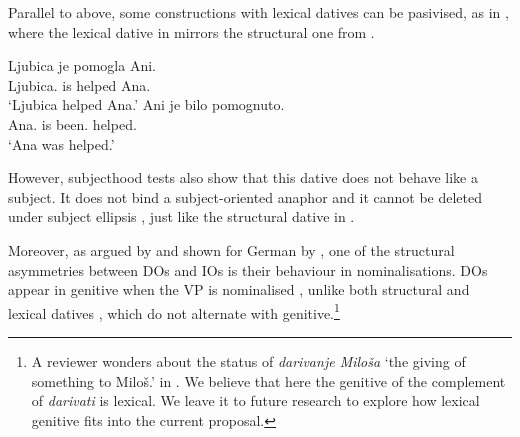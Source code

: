 \documentclass[output=paper,
modfonts,
newtxmath,
hidelinks
]{langscibook}
\begin{document}
\ea\label{dativesubjectpassive2}
\label{ex19a}
\label{ex19b}
\z \z

\noindent Parallel to  above, some constructions with lexical datives can be pasivised, as in , where the lexical dative in  mirrors the structural one from .

\ea\label{lexicaldativepassive}
\ea \gll Ljubica je pomogla Ani.\\
Ljubica.\nomm{} is helped Ana.\datt\\
\glt `Ljubica helped Ana.'
\ex \gll Ani je bilo pomognuto.\\
Ana.\datt{} is been.\nsg{} helped.\nsg\\
\glt `Ana was helped.'\label{ex20b}
\z \z

\noindent However, \citet{zaenenetal85} subjecthood tests also show that this dative does not behave like a subject. It does not bind a subject-oriented anaphor  and it cannot be deleted under subject ellipsis , just like the structural dative in .\largerpage[2]

\ea
{}\label{ex21a}
\label{ex21b}
\z \z

\noindent Moreover, as argued by \citet{maling01} and shown for German by \citet{mcfadden04}, one of the structural asymmetries between DOs and IOs is their behaviour in nominalisations. DOs appear in genitive when the VP is nominalised , unlike both structural  and lexical datives , which do not alternate with genitive.\footnote{A reviewer wonders about the status of \textit{darivanje Miloša} `the giving of something to Miloš.\genn' in . We believe that here the genitive of the complement of   \textit{darivati} is lexical. We leave it to future research to explore how lexical genitive fits into the current proposal.}
\end{document}
